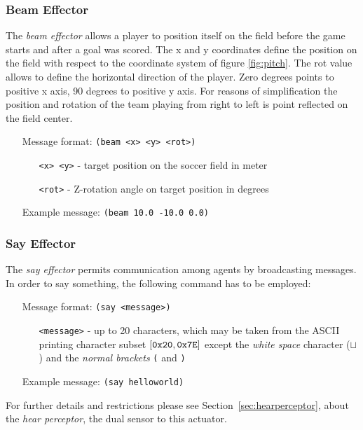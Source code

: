 \subsubsection{Beam Effector}
\label{sec:beameffector}
The \emph{beam effector} allows a player to position itself on the field before
the game starts and after a goal was scored. The x and y coordinates define the
position on the field with respect to the coordinate system of figure
\ref{fig:pitch}. The rot value allows to define the horizontal direction of the
player. Zero degrees points to positive x axis, 90 degrees to positive y axis.
For reasons of simplification the position and rotation of the team playing from
right to left is point reflected on the field center.
\begin{itemize}
	\item[Message format:] \texttt{(beam <x> <y> <rot>)}
		\begin{itemize}
		  \item[\texttt{<x> <y>} -] target position on the soccer field in meter
		  \item[\texttt{<rot>} -] Z-rotation angle on target position in degrees
		\end{itemize}
	\item[Example message:] \texttt{(beam 10.0 -10.0 0.0)}
\end{itemize}



\subsubsection{Say Effector}
\label{sec:sayeffector}

The \emph{say effector} permits communication among agents by broadcasting
messages. In order to say something, the following command has to be employed:
\begin{itemize}
	\item[Message format:] \texttt{(say <message>)}
		\begin{itemize}
		  \item[\texttt{<message>} -] up to 20 characters, which may be taken
		  from the ASCII  printing character subset $[{\tt 0x20}, {\tt 0x7E]}$ except
		  the {\it white space}  character ($\sqcup$) and the {\it normal brackets}
		  {\tt(} and {\tt )}
		\end{itemize}
	\item[Example message:] \texttt{(say helloworld)}
\end{itemize}
For further details and restrictions please see Section~\ref{sec:hearperceptor},
about the \emph{hear perceptor}, the dual sensor to this actuator.





